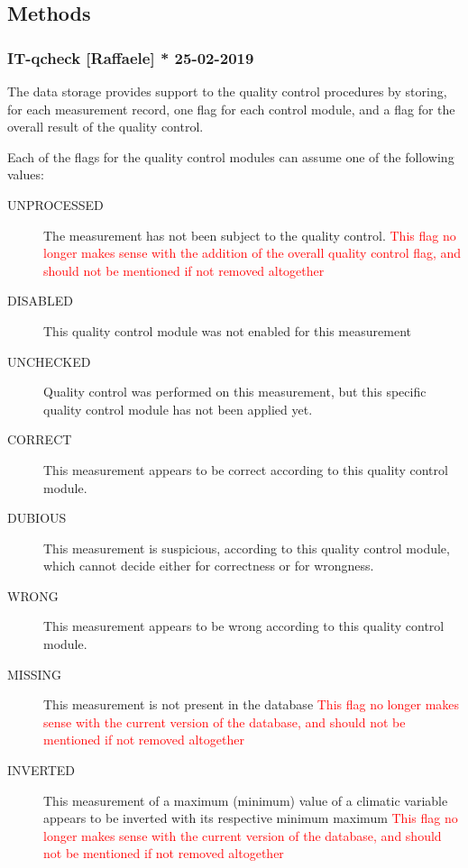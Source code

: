 \documentclass[authoryear,preprint,review,12pt]{elsarticle}
\begin{document}
\subsection{Methods}
\subsubsection{IT-qcheck [Raffaele] * 25-02-2019}\label{controlFlags}
The data storage provides support to the quality control procedures by storing, for each measurement record, one flag for each control module, and a flag for the overall result of the quality control.

Each of the flags for the quality control modules can assume one of the following values:
\begin{description}
	\item[UNPROCESSED] The measurement has not been subject to the quality control. \textcolor{Red}{This flag no longer makes sense with the addition of the overall quality control flag, and should not be mentioned if not removed altogether}
	\item[DISABLED] This quality control module was not enabled for this measurement
	\item[UNCHECKED] Quality control was performed on this measurement, but this specific quality control module has not been applied yet.
	\item[CORRECT] This measurement appears to be correct according to this quality control module.
	\item[DUBIOUS] This measurement is suspicious, according to this quality control module, which cannot decide either for correctness or for wrongness.
	\item[WRONG] This measurement appears to be wrong according to this quality control module.
	\item[MISSING] This measurement is not present in the database \textcolor{Red}{This flag no longer makes sense with the current version of the database, and should not be mentioned if not removed altogether}
	\item[INVERTED] This measurement of a maximum (minimum) value of a climatic variable appears to be inverted with its respective minimum {maximum} \textcolor{Red}{This flag no longer makes sense with the current version of the database, and should not be mentioned if not removed altogether}
\end{description}
\end{document}
